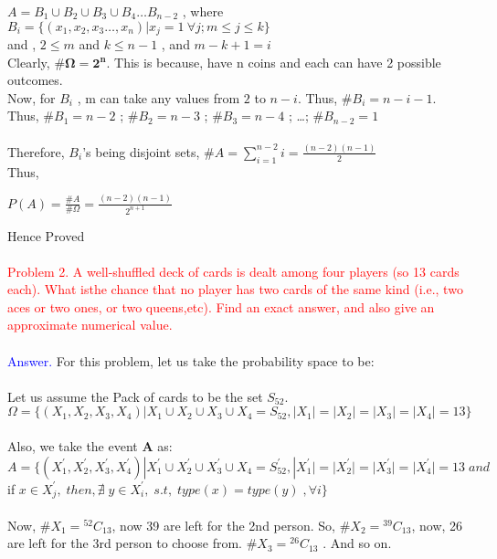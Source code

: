 \documentclass{article}
\newcommand*{\Comb}[2]{{}^{#1}C_{#2}}%
\begin{document}
$A= B_1 \cup B_2 \cup B_3 \cup B_4 \dots B_{n-2} $ , where $B_i=\{(x_1,x_2,x_3 \dots , x_n) | x_j=1 \: \forall j;  m \leq j\leq k\}$
\\ and ,\: $2\leq m$ and $k\leq n-1$ , and $m-k+1=i$
\\
\newline
Clearly, $\mathbf{\# \Omega=2^n} $. This is because, have n coins and each can have 2 possible outcomes.
\\
Now, for $B_i$ , m can take any values from $2$ to $n-i$. Thus, $\# B_i=n-i-1 $.
\\
Thus, $\# B_1=n-2$ ; $\# B_2=n-3$ ; $\# B_3=n-4$ ; \dots ; $\# B_{n-2} = 1$
\\
\\
Therefore, $B_i$'s being disjoint sets, $\#A=\sum_{i=1}^{n-2}i=\frac{(n-2)(n-1)}{2}$ 
\\
Thus,
\begin{center}
      $P(A)=\frac{\# A}{\# \Omega}=\frac{(n-2)(n-1)}{2^{n+1}}$
\end{center}
Hence Proved
\\
\\
\textcolor{red}{Problem 2. A well-shuffled deck of cards is dealt among four players (so 13 cards each).  What isthe chance that no player has two cards of the same kind (i.e., two aces or two ones, or two queens,etc). Find an exact answer, and also give an approximate numerical value.}
\\
\\
\textcolor{blue}{Answer.} For this problem, let us take the probability space to be:
\\
\\
Let us assume the Pack of cards to be the set $S_{52}$.\\
$\Omega =\{(X_1,X_2,X_3,X_4)| X_1 \cup X_2 \cup X_3 \cup X_4 = S_{52}, |X_1|=|X_2|=|X_3|=|X_4|=13 \}$
\\
\\
Also, we take the event \textbf{A} as:
\\
$A=\{(X_1^{'},X_2^{'},X_3^{'},X_4^{'})|X_1^{'}\cup X_2^{'}\cup X_3^{'}\cup X_4=S_{52}^{'}, |X_1^{'}|=|X_2^{'}|=|X_3^{'}|=|X_4^{'}|=13 \; and$  \; if $x \in X_j^{'}, \; then, \nexists \; y\in X_i^{'},\; s.t,\; type(x)= type(y) \; ,\forall i\}$
\\
\\
Now, $\#X_1=\Comb{52}{13} $, now 39 are left for the 2nd person. So, $\#X_2=\Comb{39}{13}$, now, 26 are left for the 3rd person to choose from. $\#X_3=\Comb{26}{13}$ . And so on.
\\
\end{document}
